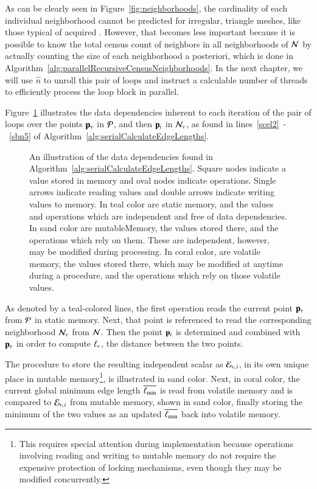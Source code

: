 As can be clearly seen in Figure~\ref{fig:neighborhoods}, the cardinality of each individual neighborhood cannot be predicted for irregular, triangle meshes, like those typical of acquired \tdd{}. However, that becomes less important because it is possible to know the total census count of neighbors in all neighborhoods of $\mathcal{N}$ by actually counting the size of each neighborhood a posteriori, which is done in Algorithm~\ref{alg:parallelRecursiveCensusNeighborhoods}. In the next chapter, we will use $\hat{n}$ to unroll this pair of loops and instruct a calculable number of threads to efficiently process the loop block in parallel.

Figure~\ref{fig:sacelDataDependencies} illustrates the data dependencies inherent to each iteration of the pair of loops over the points $\mathbf{p}_v$ in $\mathcal{P}$, and then $\mathbf{p}_i$ in $\mathcal{N}_v$, as found in lines~\ref{scel2}~-~\ref{sbn5} of Algorithm~\ref{alg:serialCalculateEdgeLengths}.

\begin{figure}[ht]
	
	{\caption[Data Dependencies in Serial Algorithm~\ref{alg:serialCalculateEdgeLengths}: Calculate Edge Lengths]{An illustration of the data dependencies found in Algorithm~\ref{alg:serialCalculateEdgeLengths}. Square nodes indicate a value stored in memory and oval nodes indicate operations. Single arrows indicate reading values and double arrows indicate writing values to memory. In teal color are static memory, and the values and operations which are independent and free of data dependencies. In sand color are \gls{mutableMemory}, the values stored there, and the operations which rely on them. These are independent, however, may be modified during processing. In coral color, are volatile memory, the values stored there, which may be modified at anytime during a procedure, and the operations which rely on those volatile values.}\label{fig:sacelDataDependencies}}
\end{figure}

As denoted by a teal-colored lines, the first operation reads the current point $\mathbf{p}_v$ from $\mathcal{P}$ in static memory. Next, that point is referenced to read the corresponding neighborhood $\mathcal{N}_v$ from $\mathcal{N}$. Then the point $\mathbf{p}_i$ is determined and combined with $\mathbf{p}_v$ in order to compute $\ell_\ast$, the distance between the two points.

The procedure to store the resulting independent scalar as $\mathcal{E}_{v,\kern.75pt i}$, in its own unique place in mutable memory\footnote{This requires special attention during implementation because operations involving reading and writing to mutable memory do not require the expensive protection of locking mechanisms, even though they may be modified concurrently.}, is illustrated in sand color. Next, in coral color, the current global minimum edge length $\overline{\ell_\text{min}}$ is read from volatile memory and is compared to $\mathcal{E}_{v,\kern.75pt i}$ from mutable memory, shown in sand color, finally storing the minimum of the two values as an updated $\overline{\ell_\text{min}}$ back into volatile memory.


